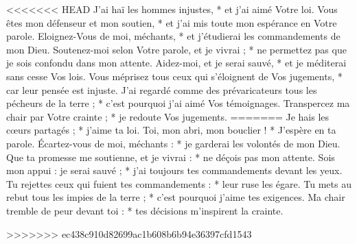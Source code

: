 <<<<<<< HEAD
J'ai haï les hommes injustes, * et j'ai aimé Votre loi.
\versseparator
Vous êtes mon défenseur et mon soutien, * et j'ai mis toute mon espérance en Votre parole.
\versseparator
Eloignez-Vous de moi, méchants, * et j'étudierai les commandements de mon Dieu.
\versseparator
Soutenez-moi selon Votre parole, et je vivrai ; * ne permettez pas que je sois confondu dans mon attente.
\versseparator
Aidez-moi, et je serai sauvé, * et je méditerai sans cesse Vos lois.
\versseparator
Vous méprisez tous ceux qui s'éloignent de Vos jugements, * car leur pensée est injuste.
\versseparator
J'ai regardé comme des prévaricateurs tous les pécheurs de la terre ; * c'est pourquoi j'ai aimé Vos témoignages.
\versseparator
Transpercez ma chair par Votre crainte ; * je redoute Vos jugements.
=======
Je hais les cœurs partagés ; *
j’aime ta loi.
\versseparator
Toi, mon abri, mon bouclier ! *
J’espère en ta parole.
\versseparator
Écartez-vous de moi, méchants : *
je garderai les volontés de mon Dieu.
\versseparator
Que ta promesse me soutienne, et je vivrai : *
ne déçois pas mon attente.
\versseparator
Sois mon appui : je serai sauvé ; *
j’ai toujours tes commandements devant les yeux.
\versseparator
Tu rejettes ceux qui fuient tes commandements : *
leur ruse les égare.
\versseparator
Tu mets au rebut tous les impies de la terre ; *
c’est pourquoi j’aime tes exigences.
\versseparator
Ma chair tremble de peur devant toi : *
tes décisions m’inspirent la crainte.

>>>>>>> ec438c910d82699ac1b608b6b94e36397cfd1543
